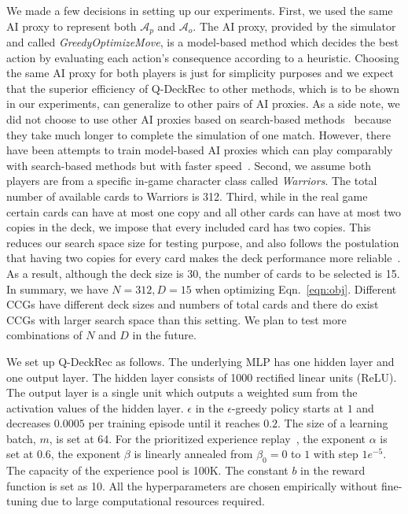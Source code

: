We made a few decisions in setting up our experiments. First, we used the same AI proxy to represent both $\mathcal{A}_p$ and $\mathcal{A}_o$. The AI proxy, provided by the simulator and called \textit{GreedyOptimizeMove}, is a model-based method which decides the best action by evaluating each action's consequence according to a heuristic. Choosing the same AI proxy for both players is just for simplicity purposes and we expect that the superior efficiency of Q-DeckRec to other methods, which is to be shown in our experiments, can generalize to other pairs of AI proxies. As a side note, we did not choose to use other AI proxies based on  search-based methods~\citep{santos2017monte} because they take much longer to complete the simulation of one match. However, there have been attempts to train model-based AI proxies which can play comparably with search-based methods but with faster speed~\citep{janusz2017helping}. Second, we assume both players are from a specific in-game character class called \textit{Warriors}. The total number of available cards to Warriors is 312. Third, while in the real game certain cards can have at most one copy and all other cards can have at most two copies in the deck, we impose that every included card has two copies. This reduces our search space size for testing purpose, and also follows the postulation that having two copies for every card makes the deck performance more reliable~\citep{garcia2016evolutionary,garcia2018automated}. As a result, although the deck size is 30, the number of cards to be selected is 15. In summary, we have $N=312, D=15$ when optimizing Eqn.~\ref{eqn:obj}. Different CCGs have different deck sizes and numbers of total cards and there do exist CCGs with larger search space than this setting. We plan to test more combinations of $N$ and $D$ in the future.
    
We set up Q-DeckRec as follows. The underlying MLP has one hidden layer and one output layer. The hidden layer consists of 1000 rectified linear units (ReLU). The output layer is a single unit which outputs a weighted sum from the activation values of the hidden layer. $\epsilon$ in the $\epsilon$-greedy policy starts at $1$ and decreases $0.0005$ per training episode until it reaches $0.2$. The size of a learning batch, $m$, is set at 64. For the prioritized experience replay~\citep{schaul2015prioritized}, the exponent $\alpha$ is set at 0.6, the exponent $\beta$ is linearly annealed from $\beta_0=0$ to $1$ with step $1e^{-5}$. The capacity of the experience pool is 100K. The constant $b$ in the reward function is set as 10. All the hyperparameters are chosen empirically without fine-tuning due to large computational resources required.  

